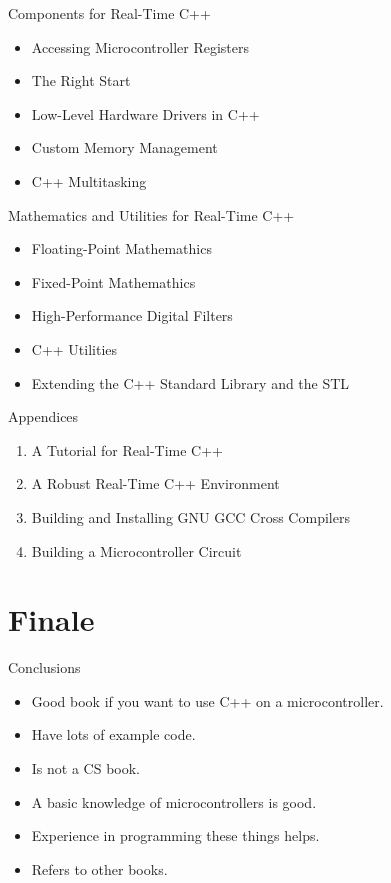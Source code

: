 \documentclass{beamer}
\begin{document}
\begin{frame}{Components for Real-Time C++}
  \begin{itemize}
  \item Accessing Microcontroller Registers
  \item The Right Start
  \item Low-Level Hardware Drivers in C++
  \item Custom Memory Management
  \item C++ Multitasking
  \end{itemize}
\end{frame}

\begin{frame}{Mathematics and Utilities for Real-Time C++}
  \begin{itemize}
  \item Floating-Point Mathemathics
  \item Fixed-Point Mathemathics
  \item High-Performance Digital Filters
  \item C++ Utilities
  \item Extending the C++ Standard Library and the STL
  \end{itemize}
\end{frame}

\begin{frame}{Appendices}
  \begin{enumerate}[A]
  \item A Tutorial for Real-Time C++
  \item A Robust Real-Time C++ Environment
  \item Building and Installing GNU GCC Cross Compilers
  \item Building a Microcontroller Circuit
  \end{enumerate}
\end{frame}



\section{Finale}

\begin{frame}{Conclusions}
\begin{itemize}
\item Good book if you want to use C++ on a microcontroller.
  \pause \item Have lots of example code.
  \pause \item Is not a CS book.
  \pause\item A basic knowledge of microcontrollers is good.
  \pause \item Experience in programming these things helps.
  \pause \item Refers to other books.
\end{itemize}
\end{frame}
\end{document}
